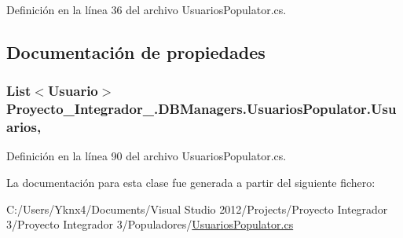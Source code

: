 Definición en la línea 36 del archivo Usuarios\-Populator.\-cs.



\subsection{Documentación de propiedades}
\hypertarget{class_proyecto___integrador__3_1_1_d_b_managers_1_1_usuarios_populator_adbf816391dedd5522f050c53a22319da}{
\subsubsection[{Usuarios}]{\setlength{\rightskip}{0pt plus 5cm}List$<${\bf Usuario}$>$ Proyecto\-\_\-\-Integrador\-\_.\-D\-B\-Managers.\-Usuarios\-Populator.\-Usuarios\hspace{0.3cm}{\ttfamily [get]}, {\ttfamily [set]}}}\label{class_proyecto___integrador__3_1_1_d_b_managers_1_1_usuarios_populator_adbf816391dedd5522f050c53a22319da}


Definición en la línea 90 del archivo Usuarios\-Populator.\-cs.



La documentación para esta clase fue generada a partir del siguiente fichero\-:\begin{DoxyCompactItemize}
\item 
C\-:/\-Users/\-Yknx4/\-Documents/\-Visual Studio 2012/\-Projects/\-Proyecto Integrador 3/\-Proyecto Integrador 3/\-Populadores/\hyperlink{_usuarios_populator_8cs}{Usuarios\-Populator.\-cs}\end{DoxyCompactItemize}
